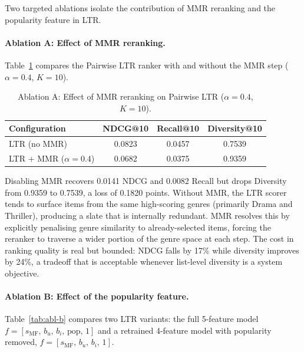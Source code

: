 \documentclass[11pt]{article}
\begin{document}
\noindent Two targeted ablations isolate the contribution of MMR reranking and the popularity feature in LTR.

\paragraph{Ablation A: Effect of MMR reranking.}

\noindent Table~\ref{tab:abl-a} compares the Pairwise LTR ranker with and without the MMR step ($\alpha = 0.4$, $K = 10$).

\begin{table}[H]
\centering
\caption{Ablation A: Effect of MMR reranking on Pairwise LTR ($\alpha = 0.4$, $K=10$).}
\label{tab:abl-a}
\begin{tabular}{lccc}
\toprule
\textbf{Configuration}      & \textbf{NDCG@10} & \textbf{Recall@10} & \textbf{Diversity@10} \\
\midrule
LTR (no MMR)                & 0.0823           & 0.0457             & 0.7539                \\
LTR + MMR ($\alpha = 0.4$)  & 0.0682           & 0.0375             & 0.9359                \\
\bottomrule
\end{tabular}
\end{table}

\noindent Disabling MMR recovers 0.0141 NDCG and 0.0082 Recall but drops Diversity from 0.9359 to 0.7539, a loss of 0.1820 points. Without MMR, the LTR scorer tends to surface items from the same high-scoring genres (primarily Drama and Thriller), producing a slate that is internally redundant. MMR resolves this by explicitly penalising genre similarity to already-selected items, forcing the reranker to traverse a wider portion of the genre space at each step. The cost in ranking quality is real but bounded: NDCG falls by 17\% while diversity improves by 24\%, a tradeoff that is acceptable whenever list-level diversity is a system objective.

\paragraph{Ablation B: Effect of the popularity feature.}

\noindent Table~\ref{tab:abl-b} compares two LTR variants: the full 5-feature model $f = [s_\text{MF},\, b_u,\, b_i,\, \text{pop},\, 1]$ and a retrained 4-feature model with popularity removed, $f = [s_\text{MF},\, b_u,\, b_i,\, 1]$.
\end{document}
